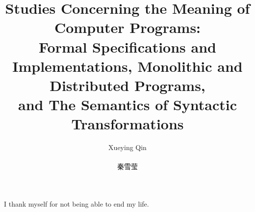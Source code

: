 \documentclass[phd,icsa,twoside,logo]{infthesis}
\title{Studies Concerning the Meaning of Computer Programs:\\\smaller Formal Specifications and Implementations, Monolithic and Distributed Programs,\\and The Semantics of Syntactic Transformations}
\author{Xueying Qin \\ \begin{CJK*}{UTF8}{gbsn}秦雪莹\end{CJK*}}
\begin{document}
\begin{preliminary}

\maketitle

\begin{acknowledgements}
I thank myself for not being able to end my life.

\end{acknowledgements}

\standarddeclaration


\tableofcontents


\end{preliminary}







% 

\appendix







\end{document}
